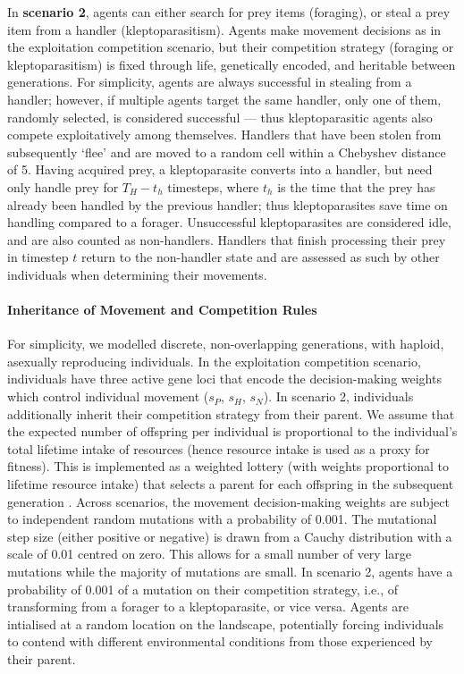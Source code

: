     In \textbf{scenario 2}, agents can either search for prey items (foraging), or steal a prey item from a handler (kleptoparasitism).
    Agents make movement decisions as in the exploitation competition scenario, but their competition strategy (foraging or kleptoparasitism) is fixed through life, genetically encoded, and heritable between generations.
    For simplicity, agents are always successful in stealing from a handler; however, if multiple agents target the same handler, only one of them, randomly selected, is considered successful --- thus kleptoparasitic agents also compete exploitatively among themselves.
    Handlers that have been stolen from subsequently `flee' and are moved to a random cell within a Chebyshev distance of 5.
    Having acquired prey, a kleptoparasite converts into a handler, but need only handle prey for $T_H - t_h$ timesteps, where $t_h$ is the time that the prey has already been handled by the previous handler; thus kleptoparasites save time on handling compared to a forager.
    Unsuccessful kleptoparasites are considered idle, and are also counted as non-handlers.
    Handlers that finish processing their prey in timestep $t$ return to the non-handler state and are assessed as such by other individuals when determining their movements.
    
    \paragraph*{Inheritance of Movement and Competition Rules}
    
    For simplicity, we modelled discrete, non-overlapping generations, with haploid, asexually reproducing individuals.
    In the exploitation competition scenario, individuals have three active gene loci that encode the decision-making weights which control individual movement ($s_P$, $s_H$, $s_N$). 
    In scenario 2, individuals additionally inherit their competition strategy from their parent.
    We assume that the expected number of offspring per individual is proportional to the individual's total lifetime intake of resources (hence resource intake is used as a proxy for fitness). 
    This is implemented as a weighted lottery (with weights proportional to lifetime resource intake) that selects a parent for each offspring in the subsequent generation \citep[see prior implementation in][]{netz2020}.
    Across scenarios, the movement decision-making weights are subject to independent random mutations with a probability of 0.001.
    The mutational step size (either positive or negative) is drawn from a Cauchy distribution with a scale of 0.01 centred on zero.
    This allows for a small number of very large mutations while the majority of mutations are small.
    In scenario 2, agents have a probability of 0.001 of a mutation on their competition strategy, i.e., of transforming from a forager to a kleptoparasite, or vice versa.
    Agents are intialised at a random location on the landscape, potentially forcing individuals to contend with different environmental conditions from those experienced by their parent.
    

